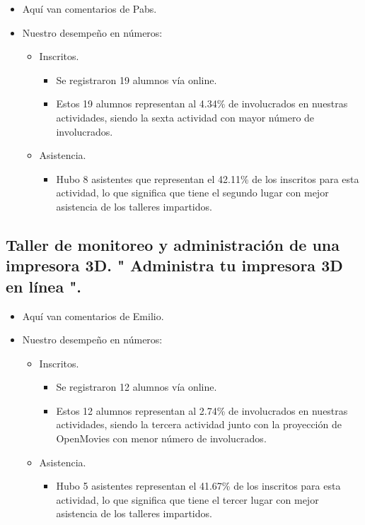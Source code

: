 \documentclass[a4paper,11pt]{article}                 %
\begin{document}
  \begin{itemize}
    \item Aquí van comentarios de Pabs.
    
    \item Nuestro desempeño en números:
    
    \begin{itemize}

    
    \item Inscritos.
    \begin{itemize}
      \item Se registraron 19 alumnos vía online.
      \item Estos 19 alumnos representan al 4.34\% de involucrados en nuestras actividades, siendo la sexta actividad con mayor número de involucrados. 
    \end{itemize}
    
    \item Asistencia.
    \begin{itemize}
      \item Hubo 8 asistentes que representan el 42.11\% de los inscritos para esta actividad, lo que significa que tiene el segundo lugar con mejor asistencia de los talleres impartidos. 
    \end{itemize}
    \end{itemize} 
    
  \end{itemize}
  
  
  \subsection{Taller de monitoreo y administración de una impresora 3D. " {Administra} tu impresora 3D en línea ".}  
  
    \begin{itemize}
    \item Aquí van comentarios de Emilio.
    
    \item Nuestro desempeño en números:
    
    \begin{itemize}

    
    \item Inscritos.
    \begin{itemize}
      \item Se registraron 12 alumnos vía online.
      \item Estos 12 alumnos representan al 2.74\% de involucrados en nuestras actividades, siendo la tercera actividad junto con la proyección de OpenMovies con menor número de involucrados. 
    \end{itemize}
    
    \item Asistencia.
    \begin{itemize}
      \item Hubo 5 asistentes representan el 41.67\% de los inscritos para esta actividad, lo que significa que tiene el tercer lugar con mejor asistencia de los talleres impartidos. 
    \end{itemize}
    \end{itemize} 
    
  \end{itemize}  
\end{document}
